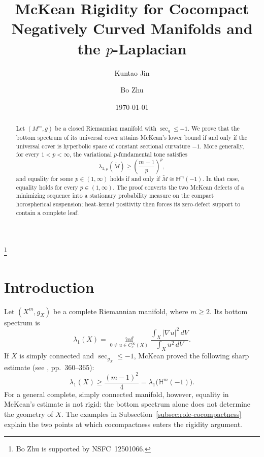 \documentclass[12pt]{amsart}
\theoremstyle{definition}
\numberwithin{equation}{section}
\newcommand{\wti}{\widetilde}
\newcommand{\bH}{\mathbb{H}}
\begin{document}
\title[McKean rigidity]{McKean Rigidity for Cocompact Negatively Curved
Manifolds and the \(p\)-Laplacian}
\date{\today}

\author{Kuntao Jin}
\address[Kuntao Jin]{Department of Mathematical Sciences, Tsinghua University}


\author{Bo Zhu}
\address[Bo Zhu]{Yau Mathematical Sciences Center,
Tsinghua University}
\thanks{Bo Zhu is supported by NSFC~12501066.}






\begin{abstract}
Let \((M^m,g)\) be a closed Riemannian manifold with
\(\sec_g\leq-1\).  We prove that the bottom spectrum of its universal
cover attains McKean's lower bound if and only if the universal cover is
hyperbolic space of constant sectional curvature \(-1\).  More generally,
for every \(1<p<\infty\), the variational \(p\)-fundamental tone satisfies
\[
  \lambda_{1,p}(\wti M)
  \geq\left(\frac{m-1}{p}\right)^p,
\]
and equality for some \(p\in(1,\infty)\) holds if and only if
\(\wti M\cong\bH^m(-1)\).  In that case, equality holds for every
\(p\in(1,\infty)\).  The proof converts the two McKean defects of a
minimizing sequence into a stationary probability measure on the compact
horospherical suspension; heat-kernel positivity then forces its
zero-defect support to contain a complete leaf. 
\end{abstract}
\maketitle
\section{Introduction}
Let \((X^m,g_X)\) be a complete Riemannian manifold, where \(m\geq2\).  Its
bottom spectrum is
\begin{equation}\label{eq:bottom-spectrum}
  \lambda_1(X)
  =\inf_{0\neq u\in C_c^\infty(X)}
  \frac{\int_X|\nabla u|^2\,dV}
       {\int_Xu^2\,dV}.
\end{equation}
If \(X\) is simply connected and \(\sec_{g_X}\leq-1\), McKean proved the
following sharp estimate (see \cite{McKean1970}, pp.~360--365):
\begin{equation}\label{eq:mckean-bound}
  \lambda_1(X)
  \geq\frac{(m-1)^2}{4}
  =\lambda_1\bigl(\bH^m(-1)\bigr).
\end{equation}
For a general complete, simply connected manifold, however, equality in
McKean's estimate is not rigid: the bottom spectrum alone does
not determine the geometry of \(X\).  The examples in
Subsection~\ref{subsec:role-cocompactness} explain the two points at which
cocompactness enters the rigidity argument.
\end{document}
